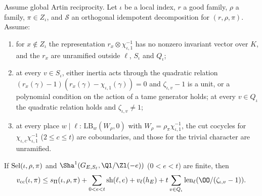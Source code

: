 \begin{theorem}\label{pf:linkN-sel:gcc}
Assume global Artin reciprocity. Let $\iota$ be a local index, $r$ a good family, $\rho$ a family, $\pi\in Z_\iota$, and $\mathcal S$ an
orthogonal idempotent decomposition for $(r,\rho,\pi)$. Assume:
\begin{enumerate}[label=(\alph*)]
\item for $x\notin Z_\iota$ the representation $r_x\otimes\chi_{\iota,1}^{-1}$ has no nonzero invariant vector over $K$, and the $r_x$ are
unramified outside $\ell$, $S_\iota$ and $Q_\iota$;
\item at every $v\in S_\iota$, either inertia acts through the quadratic relation $(r_x(\gamma)-1)(r_x(\gamma)-\chi_{\iota,1}(\gamma))=0$ and
$\zeta_{\iota,v}-1$ is a unit, or a polynomial condition on the action of a tame generator holds; at every $v\in Q_\iota$ the quadratic relation holds
and $\zeta_{\iota,v}\ne1$;
\item at every place $w\mid\ell$: $\mathrm{LB}_w(W_\rho,0)$ with $W_\rho=\rho_\pi\chi_{\iota,1}^{-1}$, the cut cocycles for
$\chi_{\iota,c}\chi_{\iota,1}^{-1}$ ($2\le c\le t$) are coboundaries, and those for the trivial character are unramified.
\end{enumerate}
If $\operatorname{Sel}(\iota,\rho,\pi)$ and $\Sha^1(G_{E,S_\ell},\Ql/\Zl(-e))$ ($0<e<t$) are finite, then
\[
\linkNselvcc(\iota,\pi)\le\linkNselsP(\iota,\rho,\pi)+\sum_{0<e<t}\mathrm{sh}(\ell,e)+v_\ell(h_E)+t\sum_{v\in Q_\iota}\linkNsellen(\OO/(\zeta_{\iota,v}-1)).
\]
\end{theorem}

